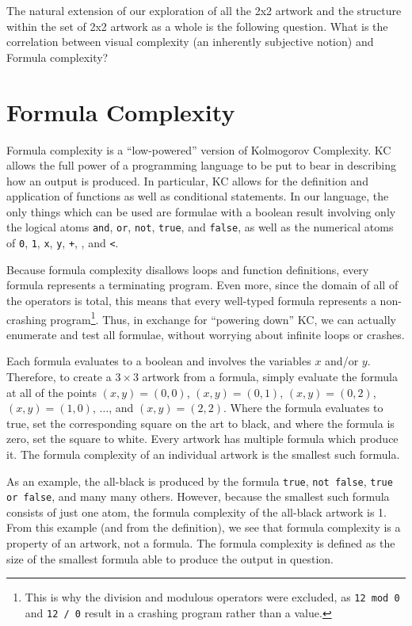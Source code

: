 

The natural extension of our exploration of all the 2x2 artwork and the structure within the set of 2x2 artwork as a whole is the following question. What is the correlation between visual complexity (an inherently subjective notion) and
Formula complexity?  

\section{Formula Complexity}
Formula complexity is a ``low-powered'' version of Kolmogorov Complexity.  KC
allows the full power of a programming language to be put to bear in describing
how an output is produced.  In particular, KC allows for the definition and
application of functions as well as conditional statements.  In our language,
the only things which can be used are formulae with a boolean result
involving only the logical atoms {\tt and}, {\tt or}, {\tt not}, {\tt true},
and {\tt false}, as well as the numerical atoms of {\tt 0}, {\tt 1}, {\tt x},
{\tt y}, {\tt +}, {\tt *}, and {\tt <}.

Because formula complexity disallows loops and function definitions, every
formula represents a terminating program.  Even more, since the domain of all
of the operators is total, this means that every well-typed formula represents
a non-crashing program\footnote{This is why the division and modulous operators
were excluded, as {\tt 12 mod 0} and {\tt 12 / 0} result in a crashing program
rather than a value.}.  Thus, in exchange for ``powering down'' KC, we can
actually enumerate and test all formulae, without worrying about infinite loops
or crashes.

Each formula evaluates to a boolean and involves the variables $x$ and/or $y$.
Therefore, to create a $3\times3$ artwork from a formula, simply evaluate the formula
at all of the points $(x,y) = (0,0)$, $(x,y) = (0,1)$, $(x,y) = (0,2)$, $(x,y)
= (1,0)$, $\ldots$, and $(x,y) = (2,2)$.  Where the formula evaluates to true,
set the corresponding square on the art to black, and where the formula is
zero, set the square to white.  Every artwork has multiple formula which
produce it.  The formula complexity of an individual artwork is the smallest
such formula.

As an example, the all-black is produced by the formula {\tt true}, {\tt not
false}, {\tt true or false}, and many many others.  However, because the
smallest such formula consists of just one atom, the formula complexity of the
all-black artwork is 1.  From this example (and from the definition), we see
that formula complexity is a property of an artwork, not a formula.  The
formula complexity is defined as the size of the smallest formula able to
produce the output in question. 

